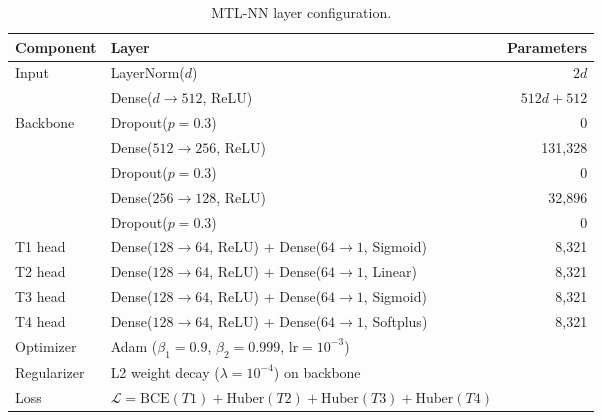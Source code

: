 \documentclass{article}
\begin{document}
\begin{table}[h]
\centering
\caption{MTL-NN layer configuration.}
\begin{tabular}{llr}
\toprule
Component & Layer & Parameters \\
\midrule
Input       & LayerNorm($d$)              & $2d$ \\
            & Dense($d \to 512$, ReLU)   & $512d + 512$ \\
Backbone    & Dropout($p=0.3$)           & 0 \\
            & Dense($512 \to 256$, ReLU) & 131{,}328 \\
            & Dropout($p=0.3$)           & 0 \\
            & Dense($256 \to 128$, ReLU) & 32{,}896 \\
            & Dropout($p=0.3$)           & 0 \\
\midrule
T1 head & Dense($128 \to 64$, ReLU) + Dense($64 \to 1$, Sigmoid) & 8{,}321 \\
T2 head & Dense($128 \to 64$, ReLU) + Dense($64 \to 1$, Linear)  & 8{,}321 \\
T3 head & Dense($128 \to 64$, ReLU) + Dense($64 \to 1$, Sigmoid) & 8{,}321 \\
T4 head & Dense($128 \to 64$, ReLU) + Dense($64 \to 1$, Softplus)& 8{,}321 \\
\midrule
Optimizer & Adam ($\beta_1{=}0.9$, $\beta_2{=}0.999$, lr$=10^{-3}$) & \\
Regularizer & L2 weight decay ($\lambda{=}10^{-4}$) on backbone & \\
Loss & $\mathcal{L} = \text{BCE}(T1) + \text{Huber}(T2) + \text{Huber}(T3) + \text{Huber}(T4)$ & \\
\bottomrule
\end{tabular}
\end{table}
\end{document}
